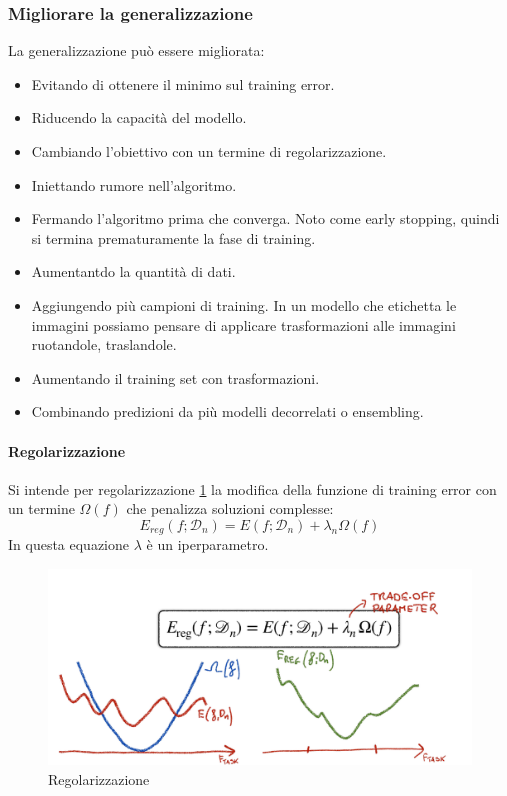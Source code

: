 	\subsubsection{Migliorare la generalizzazione}
	La generalizzazione pu\`o essere migliorata:
	\begin{multicols}{2}
		\begin{itemize}
			\item Evitando di ottenere il minimo sul training error. 
			\item Riducendo la capacit\`a del modello.
			\item Cambiando l'obiettivo con un termine di regolarizzazione.
			\item Iniettando rumore nell'algoritmo. 
			\item Fermando l'algoritmo prima che converga. Noto come early stopping, quindi si termina prematuramente la fase di training.
			\item Aumentantdo la quantit\`a di dati.
			\item Aggiungendo pi\`u campioni di training. In un modello che etichetta le immagini possiamo pensare di applicare trasformazioni alle immagini ruotandole, traslandole.
			\item Aumentando il training set con trasformazioni.
			\item Combinando predizioni da pi\`u modelli decorrelati o ensembling.
		\end{itemize}
	\end{multicols}
	
	\paragraph{Regolarizzazione}
	Si intende per regolarizzazione \ref{fig:chapter02-07} la modifica della funzione di training error con un termine $\Omega(f)$ che penalizza soluzioni complesse:
	$$E_{reg}(f;\mathcal{D}_n)=E(f;\mathcal{D}_n)+\lambda_n\Omega(f)$$
	In questa equazione $\lambda$ \`e un iperparametro.
	
	\begin{figure}
		\centering
		\includegraphics[width=0.6\linewidth]{imgs/chapter2/img7}
		\caption{Regolarizzazione}
		\label{fig:chapter02-07}
	\end{figure}


